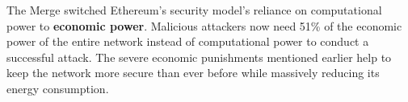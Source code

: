 The Merge switched Ethereum's security model's reliance on  computational power to \textbf{economic power}. Malicious attackers now need 51\% of the economic power of the entire network instead of computational power to conduct a successful attack. The severe economic punishments mentioned earlier help to keep the network more secure than ever before while massively reducing its energy consumption. 








